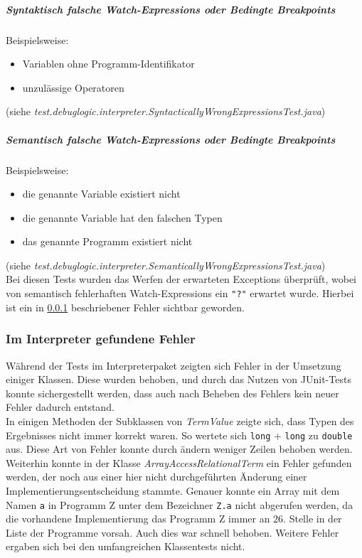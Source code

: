 \documentclass[parskip=full]{scrartcl}
\begin{document}
\subparagraph{Syntaktisch falsche Watch-Expressions oder Bedingte Breakpoints}
Beispielsweise:
\begin{itemize}
\item Variablen ohne Programm-Identifikator
\item unzulässige Operatoren
\end{itemize}
(siehe \textit{test.debuglogic.interpreter.SyntacticallyWrongExpressionsTest.java})\\

\subparagraph{Semantisch falsche Watch-Expressions oder Bedingte Breakpoints}
Beispielsweise:
\begin{itemize}
\item die genannte Variable existiert nicht
\item die genannte Variable hat den falschen Typen
\item das genannte Programm existiert nicht
\end{itemize}
(siehe \textit{test.debuglogic.interpreter.SemanticallyWrongExpressionsTest.java})\\
Bei diesen Tests wurden das Werfen der erwarteten Exceptions überprüft, wobei von semantisch fehlerhaften Watch-Expressions ein \texttt{"?"} erwartet wurde. Hierbei ist ein in \ref{fehlerImInterpreter} beschriebener Fehler sichtbar geworden.

\subsubsection{Im Interpreter gefundene Fehler}\label{fehlerImInterpreter}
Während der Tests im Interpreterpaket zeigten sich Fehler in der Umsetzung einiger Klassen. Diese wurden behoben, und durch das Nutzen von JUnit-Tests konnte sichergestellt werden, dass auch nach Beheben des Fehlers kein neuer Fehler dadurch entstand.\\
In einigen Methoden der Subklassen von \textit{TermValue} zeigte sich, dass Typen des Ergebnisses nicht immer korrekt waren. So wertete sich \texttt{long} + \texttt{long} zu \texttt{double} aus. Diese Art von Fehler konnte durch ändern weniger Zeilen behoben werden.\\
Weiterhin konnte in der Klasse \textit{ArrayAccessRelationalTerm} ein Fehler gefunden werden, der noch aus einer hier nicht durchgeführten Änderung einer Implementierungsentscheidung stammte. Genauer konnte ein Array mit dem Namen \texttt{a} in Programm Z unter dem Bezeichner \texttt{Z.a} nicht abgerufen werden, da die vorhandene Implementierung das Programm Z immer an 26. Stelle in der Liste der Programme vorsah. Auch dies war schnell behoben. Weitere Fehler ergaben sich bei den umfangreichen Klassentests nicht. \\
\end{document}
